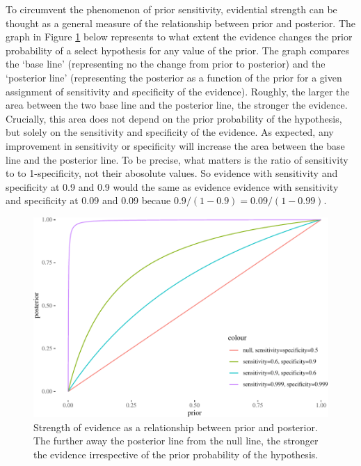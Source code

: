 \documentclass[10pt,dvipsnames,enabledeprecatedfontcommands]{scrartcl}
\begin{document}
To circumvent the phenomenon of prior sensitivity, evidential strength
can be thought as a general measure of the relationship between prior
and posterior. The graph in Figure \ref{fig:strength-prior-post} below
represents to what extent the evidence changes the prior probability of
a select hypothesis for any value of the prior. The graph compares the
`base line' (representing no the change from prior to posterior) and the
`posterior line' (representing the posterior as a function of the prior
for a given assignment of sensitivity and specificity of the evidence).
Roughly, the larger the area between the two base line and the posterior
line, the stronger the evidence. Crucially, this area does not depend on
the prior probability of the hypothesis, but solely on the sensitivity
and specificity of the evidence. As expected, any improvement in
sensitivity or specificity will increase the area between the base line
and the posterior line. To be precise, what matters is the ratio of
sensitivity to to 1-specificity, not their abosolute values. So evidence
with sensitivity and specificity at 0.9 and 0.9 would the same as
evidence evidence with sensitivity and specificity at 0.09 and 0.09
becaue \(0.9/(1-0.9) = 0.09/(1-0.99)\).

\begin{figure}


\begin{center}\includegraphics[width=0.9\linewidth]{conjunction-paradox_files/figure-latex/unnamed-chunk-13-1} \end{center}

\caption{Strength of evidence as a relationship between prior and posterior. 
The further away the posterior line from the null line, the stronger the evidence irrespective 
of the prior probability of the hypothesis.}
\label{fig:strength-prior-post}
\end{figure}
\end{document}
